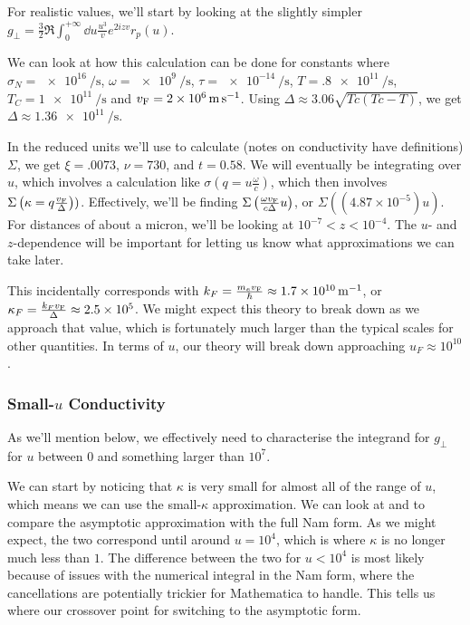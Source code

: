 \documentclass[../main.tex]{subfiles}
\begin{document}
	For realistic values, we'll start by looking at the slightly simpler $g_\perp = \frac32 \Re \int_0^{+\infty} \dd{u} \frac{u^3}{v} e^{2 i z v} r_p(u)$.

	We can look at how this calculation can be done for constants where $\sigma_N = \SI{e16}{\per\second}$, $\omega = \SI{e9}{\per\second}$, $\tau = \SI{e-14}{\per\second}$, $T = \SI{.8e11}{\per\second}$, $T_C = \SI{1e11}{\per\second}$ and $\vf = \SI{2e6}{\m\per\s}$.
	Using $\Delta \approx 3.06 \sqrt{Tc(Tc - T)}$, we get $\Delta \approx \SI{1.36e11}{\per\second}$.

	In the reduced units we'll use to calculate (notes on conductivity have definitions) $\Sigma$, we get $\xi = .0073$, $\nu = 730$, and $t = 0.58$.
	We will eventually be integrating over $u$, which involves a calculation like $\sigma\left(q = u \frac{\omega}{c}\right)$, which then involves $\Sigma\left(\kappa = q \frac{v_{\mathrm{F}}}{\Delta}\right))$.
	Effectively, we'll be finding $\Sigma\left(\frac{\omega v_{\mathrm{F}}}{c \Delta} u\right)$, or $\Sigma\left(\left( 4.87 \times 10^{-5} \right) u \right)$.
	For distances of about a micron, we'll be looking at $10^{-7} < z < 10^{-4}$.
	The $u$- and $z$-dependence will be important for letting us know what approximations we can take later.

	This incidentally corresponds with $k_F = \frac{m_e v_{\mathrm{F}}}{\hbar} \approx \SI{1.7e10}{\per\meter}$, or $\kappa_F = \frac{k_F v_{\mathrm{F}}}{\Delta} \approx 2.5 \times 10^5$.
	We might expect this theory to break down as we approach that value, which is fortunately much larger than the typical scales for other quantities.
	In terms of $u$, our theory will break down approaching $u_F \approx 10^{10}$.

	\subsubsection{Small-\texorpdfstring{$u$}{u} Conductivity} \label{subsubsec:smallucond}

	As we'll mention below, we effectively need to characterise the integrand for $g_\perp$ for $u$ between $0$ and something larger than $10^7$.

	We can start by noticing that $\kappa$ is very small for almost all of the range of $u$, which means we can use the small-$\kappa$ approximation.
	We can look at  and  to compare the asymptotic approximation with the full Nam form.
	As we might expect, the two correspond until around $u = 10^4$, which is where $\kappa$ is no longer much less than $1$.
	The difference between the two for $u < 10^4$ is most likely because of issues with the numerical integral in the Nam form, where the cancellations are potentially trickier for Mathematica to handle.
	This tells us where our crossover point for switching to the asymptotic form.
\end{document}
